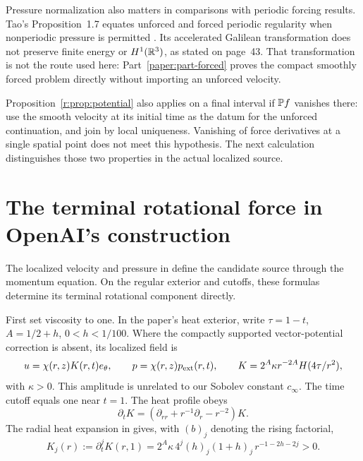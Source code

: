 Pressure normalization also matters in comparisons with periodic forcing
results. Tao's Proposition~1.7 equates unforced and forced periodic
regularity when nonperiodic pressure is permitted
\cite[pp.~28--29]{Tao2013}. Its accelerated Galilean transformation
does not preserve finite energy or \(H^1(\mathbb R^3)\), as stated on page~43.
That transformation is not the route used here: Part~\ref{paper:part-forced} proves the compact
smoothly forced problem directly without importing an unforced velocity.

Proposition~\ref{r:prop:potential} also applies on a final interval if \(\mathbb P f\) vanishes
there: use the smooth velocity at its initial time as the datum for
the unforced continuation, and join by local uniqueness.
Vanishing of force derivatives at a single spatial point does not
meet this hypothesis. The next calculation distinguishes those two
properties in the actual localized source.

\section{The terminal rotational force in OpenAI's construction}

The localized velocity and pressure in \cite[Section~10]{openai-paper}
define the candidate source through the momentum equation. On the
regular exterior and cutoffs, these formulas determine its terminal
rotational component directly.

First set viscosity to one. In the paper's heat exterior, write
\(\tau=1-t\), \(A=1/2+h\), \(0<h<1/100\). Where the compactly
supported vector-potential correction is absent, its localized field is
\begin{equation}
 u=\chi(r,z)K(r,t)e_\theta,\qquad
 p=\chi(r,z)p_{\rm ext}(r,t),\qquad
 K=2^A\kappa r^{-2A}H(4\tau/r^2),
 \label{r:eq:exterior}
\end{equation}
with \(\kappa>0\). This amplitude is unrelated to our Sobolev constant
\(c_\infty\). The time cutoff equals one near \(t=1\).
The heat profile obeys
\[
 \partial_tK=(\partial_{rr}+r^{-1}\partial_r-r^{-2})K.
\]
The radial heat expansion in \cite[Appendix~A, (A.32)--(A.35)]{openai-paper}
gives, with \((b)_j\) denoting the rising factorial,
\begin{equation}
 K_j(r):=\partial_t^jK(r,1)
 =2^A\kappa\,4^j(h)_j(1+h)_j\,r^{-1-2h-2j}>0.
 \label{r:eq:heat-jets}
\end{equation}


